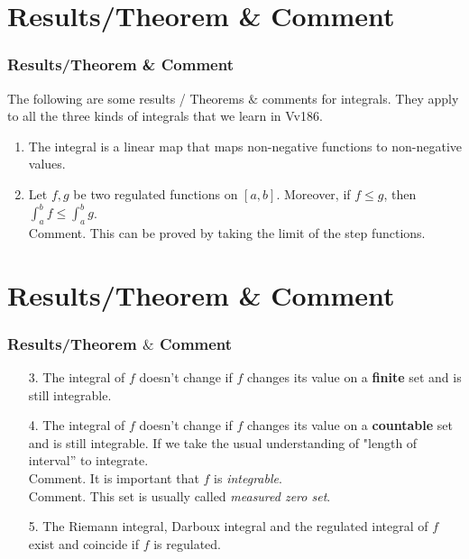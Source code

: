 \documentclass[12pt, t]{beamer}
\renewcommand{\emph}[1]{{\color{Turquoise3}\textsl{#1}}}
\begin{document}
\section{Results/Theorem \& Comment}
\begin{frame}
    \frametitle{Results/Theorem \& Comment}
    \hspace{2em}
    The following are some results / Theorems $\&$ comments for integrals. They apply to all the three kinds of integrals that we learn in Vv186.

    \begin{enumerate}
        \item The integral is a linear map that maps non-negative functions to non-negative values.\\
              \vspace{1em}
        \item Let $f,g$ be two regulated functions on $[a,b]$. Moreover, if $f\leq g$, then $\int_a^bf\leq\int_a^bg$.\\
              \footnotesize Comment. This can be proved by taking the limit of the step functions.
    \end{enumerate}

\end{frame}

\section{Results/Theorem \& Comment}
\begin{frame}
    \frametitle{Results/Theorem $\&$ Comment}
    \begin{enumerate}
        \item[3.] The integral of $f$ doesn't change if $f$ changes its value on a \textbf{finite} set and is still integrable.\\
            \vspace{1em}
        \item[4.] The integral of $f$ doesn't change if $f$ changes its value on a \textbf{countable} set and is still integrable. If we take the usual understanding of "length of interval'' to integrate.\\
            \footnotesize Comment. It is important that $f$ is \emph{integrable}.\\
            \footnotesize Comment. This set is usually called \emph{measured zero set}.\\
            \vspace{1em}
        \item[5.] The Riemann integral, Darboux integral and the regulated integral of $f$ exist and coincide if $f$ is regulated.
    \end{enumerate}
\end{frame}
\end{document}
